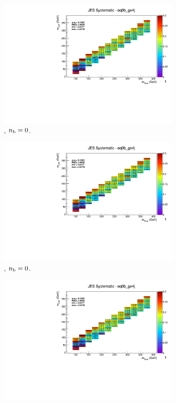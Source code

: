 \begin{figure}[ht!]
\begin{subfigure}[b]{0.32\textwidth}
    \includegraphics[width=\textwidth, page=12]{Figs/sms/t2degen/v19/systs/T2_4body_JES_eq0b_ge4j.pdf}
    \caption{\njhigh, $n_{\text{b}} = 0$.}
  \end{subfigure}
  \begin{subfigure}[b]{0.32\textwidth}
    \includegraphics[width=\textwidth, page=8]{Figs/sms/t2degen/v19/systs/T2_4body_JES_eq0b_ge4j.pdf}
    \caption{\njhigh, $n_{\text{b}} = 0$.}
  \end{subfigure}
  \begin{subfigure}[b]{0.32\textwidth}
    \includegraphics[width=\textwidth, page=1]{Figs/sms/t2degen/v19/systs/T2_4body_JES_eq0b_ge4j.pdf}

\end{subfigure}
\end{figure}
